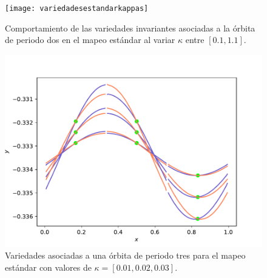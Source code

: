 \begin{figure}[H]
	\centering
	\texttt{[image: variedadesestandarkappas]}
	\caption{Comportamiento de las variedades invariantes asociadas a la \'orbita de periodo dos en el mapeo est\'andar al variar $\kappa$ entre $[0.1,1.1]$.}
	\label{variedadesestandarkappasv}
\end{figure}

\begin{figure}[H]
	\centering
	\includegraphics[scale=0.5]{variedadesestperiodo3kvar}
	\caption{Variedades asociadas a una \'orbita de periodo tres para el mapeo est\'andar con valores de $\kappa = [0.01,0.02,0.03]$. }
	\label{vairedadesperiodo3kvariable}
\end{figure}

